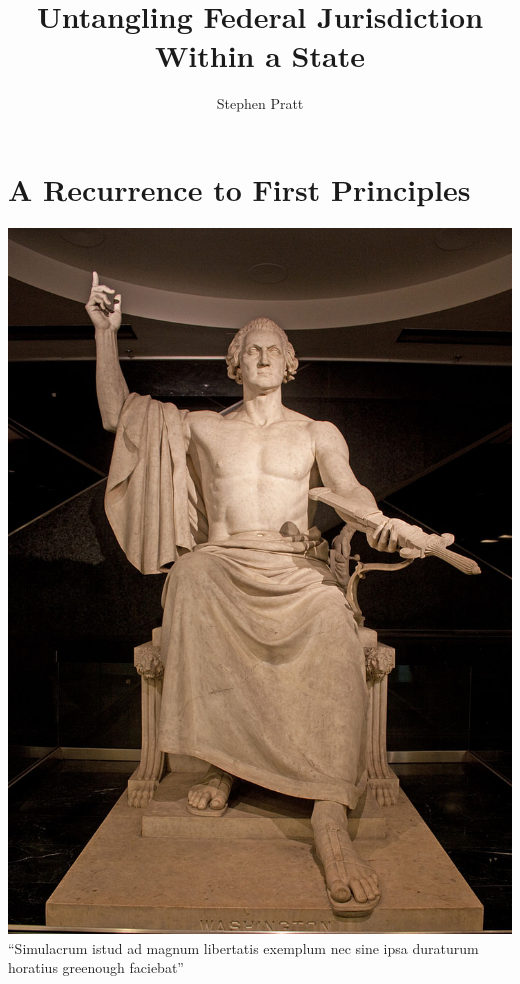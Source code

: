 



\usepackage[utf8]{inputenc}
\def\braces#1{[#1]}


\title[Untangling Federal Jurisdiction]{Untangling Federal Jurisdiction Within a State}
\author{Stephen Pratt}

\section{A Recurrence to First Principles}

\begin{frame}
    \centering
    \includegraphics[height=.85\textheight]{img/washington-greenough-face.jpg} \\
    ``Simulacrum istud ad magnum libertatis exemplum nec sine ipsa duraturum
    horatius greenough faciebat'' \\
\end{frame}

